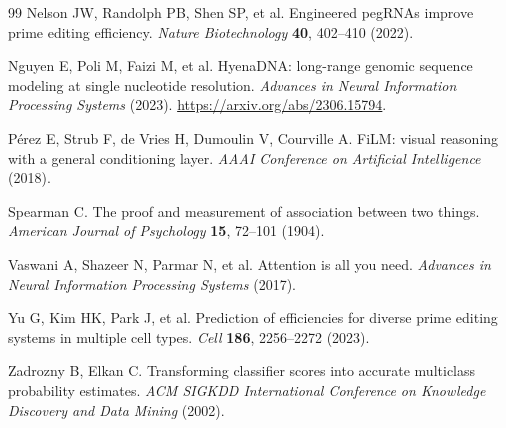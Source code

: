 \documentclass[11pt]{article}
\begin{document}
\begin{thebibliography}{99}
Nelson JW, Randolph PB, Shen SP, et al.
Engineered pegRNAs improve prime editing efficiency.
\emph{Nature Biotechnology} \textbf{40}, 402--410 (2022).

Nguyen E, Poli M, Faizi M, et al.
HyenaDNA: long-range genomic sequence modeling at single nucleotide resolution.
\emph{Advances in Neural Information Processing Systems} (2023).
\url{https://arxiv.org/abs/2306.15794}.

P\'erez E, Strub F, de Vries H, Dumoulin V, Courville A.
FiLM: visual reasoning with a general conditioning layer.
\emph{AAAI Conference on Artificial Intelligence} (2018).

Spearman C.
The proof and measurement of association between two things.
\emph{American Journal of Psychology} \textbf{15}, 72--101 (1904).

Vaswani A, Shazeer N, Parmar N, et al.
Attention is all you need.
\emph{Advances in Neural Information Processing Systems} (2017).

Yu G, Kim HK, Park J, et al.
Prediction of efficiencies for diverse prime editing systems in multiple cell types.
\emph{Cell} \textbf{186}, 2256--2272 (2023).

Zadrozny B, Elkan C.
Transforming classifier scores into accurate multiclass probability estimates.
\emph{ACM SIGKDD International Conference on Knowledge Discovery and Data Mining}
(2002).

\end{thebibliography}
\end{document}

